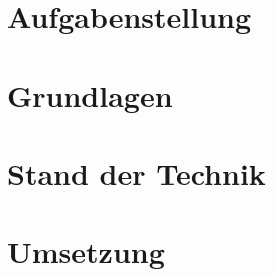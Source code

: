 \documentclass[
	ngerman,
	a4paper,
	twoside
]{scrbook}
\begin{document}
	
\chapter{Aufgabenstellung}



\chapter{Grundlagen}



\chapter{Stand der Technik}



\chapter{Umsetzung}













	\printbibliography
\end{document}
